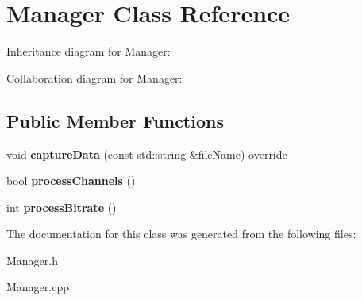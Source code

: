 \hypertarget{classManager}{}\section{Manager Class Reference}
\label{classManager}


Inheritance diagram for Manager\+:


Collaboration diagram for Manager\+:
\subsection*{Public Member Functions}
\begin{DoxyCompactItemize}
\item 
\mbox{\label{classManager_a68c3cf4ff1348440bc90d25e2117456f}} 
void {\bfseries capture\+Data} (const std\+::string \&file\+Name) override
\item 
\mbox{\label{classManager_a7ff5a62da0356b29914a7d522804f7db}} 
bool {\bfseries process\+Channels} ()
\item 
\mbox{\label{classManager_aecc43c5b94882a1f497b6e15f1327fc6}} 
int {\bfseries process\+Bitrate} ()
\end{DoxyCompactItemize}


The documentation for this class was generated from the following files\+:\begin{DoxyCompactItemize}
\item 
Manager.\+h\item 
Manager.\+cpp\end{DoxyCompactItemize}
